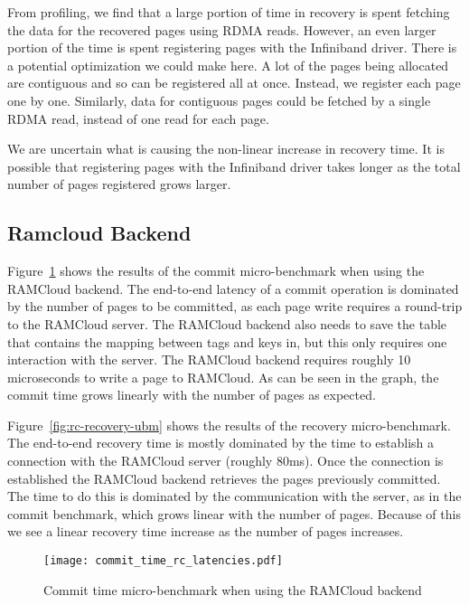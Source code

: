 From profiling, we find that a large portion of time in recovery is spent
fetching the data for the recovered pages using RDMA reads. However, an even
larger portion of the time is spent registering pages with the Infiniband
driver. There is a potential optimization we could make here. A lot of the
pages being allocated are contiguous and so can be registered all at once.
Instead, we register each page one by one. Similarly, data for contiguous
pages could be fetched by a single RDMA read, instead of one read for each page.

We are uncertain what is causing the non-linear increase in recovery time.
It is possible that registering pages with the Infiniband driver takes
longer as the total number of pages registered grows larger.

\subsection{Ramcloud Backend}

Figure~\ref{fig:rc-commit-ubm} shows the results of the commit micro-benchmark
when using the RAMCloud backend.  The end-to-end latency of a commit operation
is dominated by the number of pages to be committed, as each page write
requires a round-trip to the RAMCloud server.  The RAMCloud backend also needs
to save the table that contains the mapping between tags and keys in, but this
only requires one interaction with the server.  The RAMCloud backend requires
roughly 10 microseconds to write a page to RAMCloud. As can be seen in the
graph, the commit time grows linearly with the number of pages as expected.

Figure~\ref{fig:rc-recovery-ubm} shows the results of the recovery
micro-benchmark.  The end-to-end recovery time is mostly dominated by the time
to establish a connection with the RAMCloud server (roughly 80ms).  Once the
connection is established the RAMCloud backend retrieves the pages previously
committed. The time to do this is dominated by the communication with the
server, as in the commit benchmark, which grows linear with the number of
pages.  Because of this we see a linear recovery time increase as the number of
pages increases.

\begin{figure}[t!]
\begin{center}
\texttt{[image: commit\_time\_rc\_latencies.pdf]}
\end{center}
\caption{Commit time micro-benchmark when using the RAMCloud backend}
\label{fig:rc-commit-ubm}
\end{figure}

